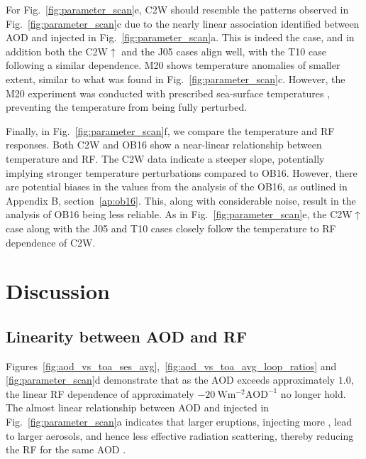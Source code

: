 \documentclass[draft]{agujournal2019}
\newcommand{\iso}[1][i]{{#1}njected \ce{SO2}}
\newcommand{\cwsn}{C2W\(\uparrow\)}
\begin{document}
For Fig.~\ref{fig:parameter_scan}e, C2W should resemble the patterns observed in
Fig.~\ref{fig:parameter_scan}c due to the nearly linear association identified between
AOD and \iso{} in Fig.~\ref{fig:parameter_scan}a. This is indeed the case, and in
addition both the \cwsn{} and the J05 cases align well, with the T10 case following a
similar dependence. M20 shows temperature anomalies of smaller extent, similar to what
was found in Fig.~\ref{fig:parameter_scan}c. However, the M20 experiment was conducted
with prescribed sea-surface temperatures \cite{marshall2020}, preventing the temperature
from being fully perturbed.

Finally, in Fig.~\ref{fig:parameter_scan}f, we compare the temperature and RF responses.
Both C2W and OB16 show a near-linear relationship between temperature and RF. The C2W
data indicate a steeper slope, potentially implying stronger temperature perturbations
compared to OB16. However, there are potential biases in the values from the analysis of
the OB16, as outlined in Appendix B, section~\ref{ap:ob16}. This, along with
considerable noise, result in the analysis of OB16 being less reliable. As in
Fig.~\ref{fig:parameter_scan}e, the \cwsn{} case along with the J05 and T10 cases
closely follow the temperature to RF dependence of C2W.

\section{Discussion}\label{sec:discussion}


\subsection{Linearity between AOD and RF}

Figures~\ref{fig:aod_vs_toa_ses_avg},~\ref{fig:aod_vs_toa_avg_loop_ratios} and
\ref{fig:parameter_scan}d demonstrate that as the AOD exceeds approximately \(1.0\), the
linear RF dependence of approximately \(\SI{-20}{\watt\metre^{-2}\mathrm{AOD}^{-1}}\) no
longer hold. The almost linear relationship between AOD and \iso{} in
Fig.~\ref{fig:parameter_scan}a indicates that larger eruptions, injecting more ,
lead to larger aerosols, and hence less effective radiation scattering, thereby reducing
the RF for the same AOD \cite{english2013, timmreck2010, timmreck2018}.
\end{document}

